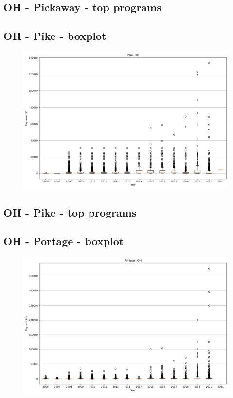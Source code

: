 \subsection*{OH - Pickaway - top programs}

\newpage
\subsection*{OH - Pike - boxplot}
\begin{figure}[h]
\centering
\includegraphics[width=7in]{../output/boxplots/counties/Pike-OH_boxplot.png}
\end{figure}


\subsection*{OH - Pike - top programs}

\newpage
\subsection*{OH - Portage - boxplot}
\begin{figure}[h]
\centering
\includegraphics[width=7in]{../output/boxplots/counties/Portage-OH_boxplot.png}
\end{figure}



